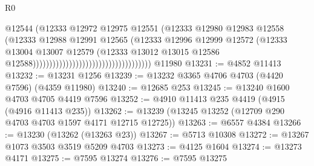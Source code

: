 \begin{lexlean}{R0}
\begin{coremodule}
                                                                @12544
                                                                (@12333
                                                                  @12972
                                                                  @12975
                                                                  @12551
                                                                  (@12333
                                                                    @12980
                                                                    @12983
                                                                    @12558
                                                                    (@12333
                                                                      @12988
                                                                      @12991
                                                                      @12565
                                                                      (@12333
                                                                        @12996
                                                                        @12999
                                                                        @12572
                                                                        (@12333
                                                                          @13004
                                                                          @13007
                                                                          @12579
                                                                          (@12333
                                                                            @13012
                                                                            @13015
                                                                            @12586
                                                                            @12588))))))))))))))))))))))))))))))))))))
    @11980
@13231 := @4852 @11413
@13232 := @13231 @1256
@13239 := @13232 @3365 @4706 @4703 (@4420 @7596) (@4359 @11980)
@13240 := @12685 @253
@13245 := @13240 @1600 @4703 @4705 @4419 @7596
@13252 := @4910 @11413 @235 @4419 (@4915 (@4916 @11413 @235))
@13262 := @13239 (@13245 @13252 (@12709 @290 @4703 @4703 @1597 @4171 @12715 @12725))
@13263 := @6557 @4384
@13266 := @13230 (@13262 (@13263 @23))
@13267 := @5713 @10308
@13272 := @13267 @1073 @3503 @3519 @5209 @4703
@13273 := @4125 @1604
@13274 := @13273 @4171
@13275 := @7595 @13274
@13276 := @7595 @13275

\end{coremodule}
\end{lexlean}

